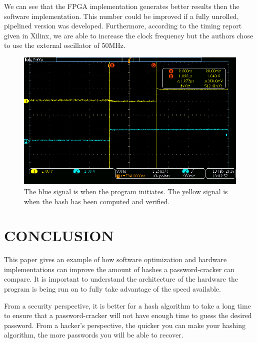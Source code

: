 \documentclass[letterpaper, 10 pt, conference]{ieeeconf}  %
\begin{document}
We can see that the FPGA implementation generates better results then the software implementation.  This number could be improved if a fully unrolled, pipelined version was developed.  Furthermore, according to the timing report given in Xilinx, we are able to increase the clock frequency but the authors chose to use the external oscillator of 50MHz.

\begin{figure}[thpb]
	\centering
	\includegraphics[scale=.35]{tek00001}
    \caption{The blue signal is when the program initiates. The yellow signal is when the hash has been computed and verified.}
\end{figure} 


\section{CONCLUSION}

This paper gives an example of how software optimization and hardware implementations can improve the amount of hashes a password-cracker can compare.  It is important to understand the architecture of the hardware the program is being run on to fully take advantage of the speed available.

From a security perspective, it is better for a hash algorithm to take a long time to ensure that a password-cracker will not have enough time to guess the desired password.  From a hacker's perspective, the quicker you can make your hashing algorithm, the more passwords you will be able to recover.

\addtolength{\textheight}{-12cm}   %
\end{document}
